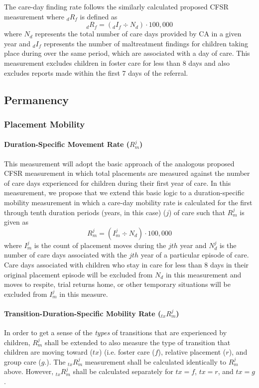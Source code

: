 \documentclass[12pt]{article}\usepackage[]{graphicx}\usepackage[]{color}
\begin{document}
The care-day finding rate follows the similarly calculated proposed CFSR measurement where ${}_{d}R_f$ is defined as 
\begin{equation}\label{eq:dRf}
{}_{d}R_f = ({}_{d}I_f \div N_d) \cdot 100,000
\end{equation}
where $N_d$ represents the total number of care days provided by CA in a given year and ${}_{d}I_f$ represents the number of maltreatment findings for children taking place during over the same period, which are associated with a day of care. This measurement excludes children in foster care for less than 8 days and also excludes reports made within the first 7 days of the referral. 

\subsection{Permanency}

\subsubsection{Placement Mobility}

\paragraph{Duration-Specific Movement Rate ($R_m^j$)}
This measurement will adopt the basic approach of the analogous proposed CFSR measurement in which total placements are measured against the number of care days experienced for children during their first year of care. In this measurement, we propose that we extend this basic logic to a duration-specific mobility measurement in which a care-day mobility rate is calculated for the first through tenth duration periods (years, in this case) ($j$) of care such that $R_m^j$ is given as 
\begin{equation}\label{eq:Rmj}
R_m^j = (I_m^j \div N_d) \cdot 100,000
\end{equation}
where $I_m^j$ is the count of placement moves during the $jth$ year and $N_d^j$ is the number of care days associated with the $jth$ year of a particular episode of care. Care days associated with children who stay in care for less than 8 days in their original placement episode will be excluded from $N_d$ in this measurement and moves to respite, trial returns home, or other temporary situations will be excluded from $I_m^j$ in this measure. 

\paragraph{Transition-Duration-Specific Mobility Rate (${}_{tx}R_m^j$)}
In order to get a sense of the \emph{types} of transitions that are experienced by children, $R_m^j$ shall be extended to also measure the type of transition that children are moving toward ($tx$) (i.e. foster care ($f$), relative placement ($r$), and group care ($g$.). The ${}_{tx}R_m^j$ measurement shall be calculated identically to $R_m^j$ above. However, ${}_{tx}R_m^j$ shall be calculated separately for $tx=f$, $tx=r$, and $tx=g$. 
\end{document}
